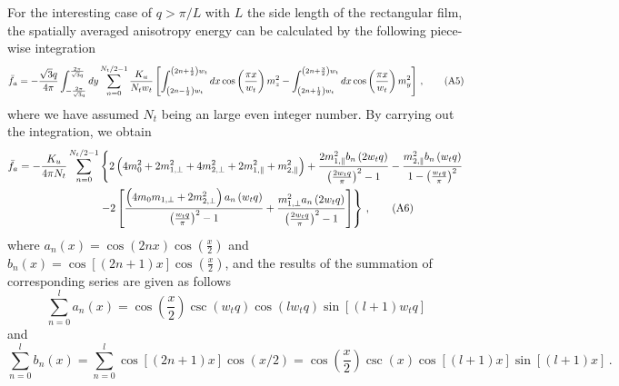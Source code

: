 \documentclass[10pt,onecolumn,prb,aps,notitlepage]{revtex4}
\begin{document}
For the interesting case of $q>\pi /L$ with $L$ the side length of the
rectangular film, the spatially averaged anisotropy energy can be calculated
by the following piece-wise integration
\begin{equation}
\bar{f}_{a}=-\frac{\sqrt{3}q}{4\pi }\int_{-\frac{2\pi }{\sqrt{3}q}}^{\frac{%
2\pi }{\sqrt{3}q}}dy\sum_{n=0}^{N_{t}/2-1}\frac{K_{u}}{N_{t}w_{t}}\left[
\int_{\left( 2n-\frac{1}{2}\right) w_{t}}^{\left( 2n+\frac{1}{2}\right)
w_{t}}dx\cos \left( \frac{\pi x}{w_{t}}\right) m_{z}^{2}-\int_{\left( 2n+%
\frac{1}{2}\right) w_{t}}^{\left( 2n+\frac{3}{2}\right) w_{t}}dx\cos \left(
\frac{\pi x}{w_{t}}\right) m_{y}^{2}\right]\,,   \tag{A5}
\end{equation}%
where we have assumed $N_{t}$ being an large even integer number.  By
carrying out the integration, we obtain%
\begin{align}
\bar{f}_{a} =-\frac{K_{u}}{4\pi N_{t}}\sum_{n=0}^{N_{t}/2-1} &\left\{
2\left( 4m_{0}^{2}+2m_{1,\perp }^{2}+4m_{2,\perp }^{2}+2m_{1,\parallel
}^{2}+m_{2,\parallel }^{2}\right)+ \frac{2m_{1,\parallel }^{2}b_{n}\left( 2w_{t}q\right) }{\left(
\frac{2w_{t}q}{\pi }\right) ^{2}-1}-\frac{m_{2,\parallel }^{2}b_{n}\left(
w_{t}q\right) }{1-\left( \frac{w_{t}q}{\pi }\right) ^{2}} \right.   \notag \\
& \left. -2\left[\frac{\left( 4m_{0}m_{1,\perp }+2m_{2,\perp }^{2}\right) a_{n}\left( w_{t}q\right)}{\left( \frac{w_{t}q}{\pi }\right) ^{2}-1}+\frac{m_{1,\perp
}^{2}a_{n}\left( 2w_{t}q\right) }{\left( \frac{2w_{t}q}{\pi }\right) ^{2}-1}
\right] \right\} \,,  \tag{A6}
 \label{APP-Eq: f_a}
\end{align}%
where $a_{n}\left( x\right) =\cos \left( 2nx\right) \cos \left( \frac{x}{2}%
\right) $ and $b_{n}\left( x\right) =\cos \left[ \left( 2n+1\right) x\right]
\cos \left( \frac{x}{2}\right) $, and the results of the summation of
corresponding series are given as follows
\begin{equation}
\sum_{n=0}^{l}a_{n}\left( x\right) =\cos \left( \frac{x}{2}\right) \csc
\left( w_{t}q\right) \cos \left( lw_{t}q\right) \sin \left[ \left(
l+1\right) w_{t}q\right]  \tag{A7}   \label{APP-Eq: a_n}
\end{equation}%
and
\begin{equation}
\sum_{n=0}^{l}b_{n}\left( x\right) =\sum_{n=0}^{l}\cos \left[ \left(
2n+1\right) x\right] \cos \left( x/2\right) =\cos \left( \frac{x}{2}\right)
\csc \left( x\right) \cos \left[ \left( l+1\right) x\right] \sin \left[
\left( l+1\right) x\right]\,. \tag{A8}  \label{APP-Eq:b_n}
\end{equation}%
\end{document}
